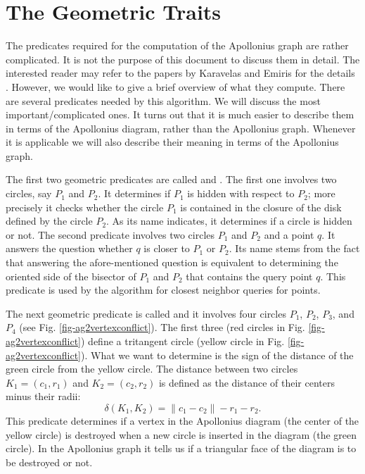 \section{The Geometric Traits}
\label{sec:apollonius2-traits}

The predicates required for the computation of the Apollonius graph
are rather complicated. It is not the purpose of this document to
discuss them in detail. The interested reader may refer to the papers
by Karavelas and Emiris for the details
\cite{ke-ppawv-02,ke-rctac-03}. However, we would like to give a brief
overview of what they 
compute. There are several predicates needed by this algorithm. We
will discuss the most important/complicated ones. It turns out that
it is much easier to describe them in terms of the Apollonius diagram,
rather than the Apollonius graph. Whenever it is applicable we will also
describe their meaning in terms of the Apollonius graph.


The first two geometric predicates are called
 and . The first one
involves two circles, say $P_1$ and $P_2$. It determines if $P_1$ is
hidden with respect to $P_2$; more precisely it checks whether the
circle $P_1$ is contained in the closure of the disk defined by the
circle $P_2$. As its name indicates, it determines if a circle is
hidden or not. The second predicate involves two circles $P_1$ and
$P_2$ and a point $q$. It answers the question whether $q$ is closer
to $P_1$ or $P_2$. Its name stems from the fact that answering the
afore-mentioned question is equivalent to determining the oriented
side of the bisector of $P_1$ and $P_2$ that contains the query point
$q$. This predicate is used by the algorithm for closest neighbor
queries for points.


The next geometric predicate is called  and it
involves four circles $P_1$, $P_2$, $P_3$, and $P_4$ (see
Fig. \ref{fig-ag2vertexconflict}). The first three (red circles in
Fig. \ref{fig-ag2vertexconflict}) define a tritangent circle (yellow
circle in Fig. \ref{fig-ag2vertexconflict}). What we want to determine is
the sign of the distance of the green circle from the yellow
circle. The distance between two circles $K_1=(c_1,r_1)$ and
$K_2=(c_2, r_2)$ is defined as the distance of their centers minus
their radii:
\[   \delta(K_1, K_2) = \|c_1-c_2\|-r_1-r_2. \]
This predicate determines if a vertex in the Apollonius diagram
(the center of the yellow circle) is destroyed when a new circle is
inserted in the diagram (the green circle). In the Apollonius graph
it tells us if a triangular face of the diagram is to be destroyed or
not.

